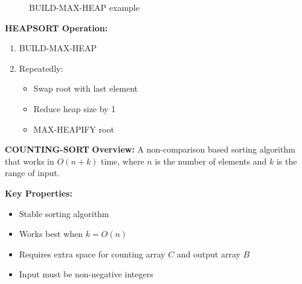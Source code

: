 \begin{figure}[H]
    \centering
    \caption*{BUILD-MAX-HEAP example}
\end{figure}

\textbf{HEAPSORT Operation:}
\begin{enumerate}
    \item BUILD-MAX-HEAP
    \item Repeatedly:
        \begin{itemize}[noitemsep,topsep=0pt]
            \item Swap root with last element
            \item Reduce heap size by 1
            \item MAX-HEAPIFY root
        \end{itemize}
\end{enumerate}

\textbf{COUNTING-SORT}
\textbf{Overview:} A non-comparison based sorting algorithm that works in $O(n + k)$ time, where $n$ is the number of elements and $k$ is the range of input.

\textbf{Key Properties:}
\begin{itemize}[noitemsep]
    \item Stable sorting algorithm
    \item Works best when $k = O(n)$
    \item Requires extra space for counting array $C$ and output array $B$
    \item Input must be non-negative integers
\end{itemize}

